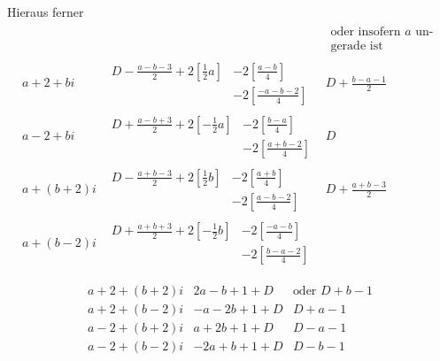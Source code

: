 Hieraus ferner
{\footnotesize
\[
\begin{array}{l|l|l}
&&\begin{gathered}\text{oder insofern }a\text{ un-}\\\text{gerade ist}\end{gathered}\\
a+2+bi&\begin{aligned}D-\tfrac{a-b-3}2+2[\tfrac12a]&-2[\tfrac{a-b}4]\\&-2[\tfrac{-a-b-2}4]\end{aligned}&D+\tfrac{b-a-1}2\\[1ex]
a-2+bi&\begin{aligned}D+\tfrac{a-b+3}2+2[-\tfrac12a]&-2[\tfrac{b-a}4]\\&-2[\tfrac{a+b-2}4]\end{aligned}&D\\[1ex]
a+(b+2)i&\begin{aligned}D-\tfrac{a+b-3}2+2[\tfrac12b]&-2[\tfrac{a+b}4]\\&-2[\tfrac{a-b-2}4]\end{aligned}&D+\tfrac{a+b-3}2\\[1ex]
a+(b-2)i&\begin{aligned}D+\tfrac{a+b+3}2+2[-\tfrac12b]&-2[\tfrac{-a-b}4]\\&-2[\tfrac{b-a-2}4]\end{aligned}&
\end{array}
\]
}

\[
\begin{array}{l|rl}
a+2+(b+2)i&2a-b+1+D&\text{oder }D+b-1\\
a+2+(b-2)i&-a-2b+1+D&D+a-1\\
a-2+(b+2)i&a+2b+1+D&D-a-1\\
a-2+(b-2)i&-2a+b+1+D&D-b-1
\end{array}
\]

